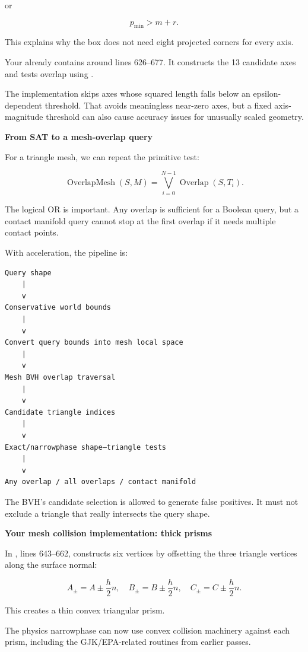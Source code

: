 or

\[
p_{\min}>m+r.
\]

This explains why the box does not need eight projected corners for every axis.

Your  already contains  around lines 626--677. It constructs the 13 candidate axes and tests overlap using .

The implementation skips axes whose squared length falls below an epsilon-dependent threshold. That avoids meaningless near-zero axes, but a fixed axis-magnitude threshold can also cause accuracy issues for unusually scaled geometry.

\textbf{From SAT to a mesh-overlap query}

For a triangle mesh, we can repeat the primitive test:

\[
\operatorname{OverlapMesh}(S,M) = \bigvee_{i=0}^{N-1}\operatorname{Overlap}(S,T_i).
\]

The logical OR is important. Any overlap is sufficient for a Boolean query, but a contact manifold query cannot stop at the first overlap if it needs multiple contact points.

With acceleration, the pipeline is:

\begin{verbatim}
Query shape
    |
    v
Conservative world bounds
    |
    v
Convert query bounds into mesh local space
    |
    v
Mesh BVH overlap traversal
    |
    v
Candidate triangle indices
    |
    v
Exact/narrowphase shape–triangle tests
    |
    v
Any overlap / all overlaps / contact manifold
\end{verbatim}

The BVH's candidate selection is allowed to generate false positives. It must not exclude a triangle that really intersects the query shape.

\textbf{Your mesh collision implementation: thick prisms}

In , lines 643--662,  constructs six vertices by offsetting the three triangle vertices along the surface normal:

\[
A_\pm=A\pm\frac{h}{2}n,\quad B_\pm=B\pm\frac{h}{2}n,\quad C_\pm=C\pm\frac{h}{2}n.
\]

This creates a thin convex triangular prism.

The physics narrowphase can now use convex collision machinery against each prism, including the GJK/EPA-related routines from earlier passes.

